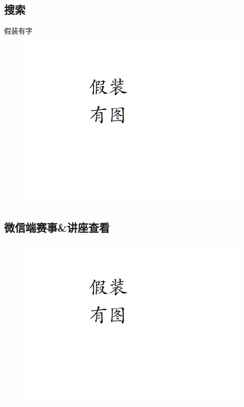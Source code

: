 \documentclass[UTF8]{ctexart}
\begin{document}
\newpage
\subsection{搜索}
假装有字
\begin{figure}[h]
    \centering
    \includegraphics[width=\textwidth]{manual_images//temp.png}
\end{figure}

\newpage
\subsection{微信端赛事\&讲座查看}
\begin{figure}[h]
    \centering
    \includegraphics[width=\textwidth]{manual_images//temp.png}
\end{figure}
\end{document}
